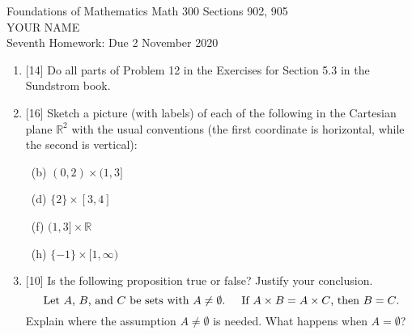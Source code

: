 \documentclass[12pt]{article}
\newcommand{\RR}{{\mathbb R}}
\begin{document}
\LARGE 
\noindent
{\color{Maroon}Foundations of Mathematics \hfill Math 300 Sections 902, 905}\vspace{2pt}\\
\Large YOUR NAME\vspace{2pt}\\
\large
Seventh Homework: \hfill Due 2 November 2020
\normalsize    %

\noindent{\color{blue}\rule{529pt}{2pt}}

  
\begin{enumerate}


\item{[14]} Do all parts of Problem 12 in the Exercises for Section 5.3 in the Sundstrom book.

\item{[16]} Sketch a picture (with labels) of each of the following in the Cartesian plane $\RR^2$ with the usual conventions
    (the first coordinate is horizontal, while the second is vertical):

  \ (b) $(0,2)\times (1,3]$

  \  (d) $\{2\}\times [3,4]$ 

  \makebox[250pt][l]{(e) $\RR\times (2,4)$}\    (f) $(1,3]\times \RR$

  \makebox[250pt][l]{(g) $\RR\times \{-1\}$}\   (h) $\{-1\}\times [1,\infty)$




\item{[10]}  Is the following proposition true or false?  Justify your conclusion.
  \[
    \mbox{ Let $A$, $B$, and $C$ be sets with $A\neq\emptyset$. \quad
    If $A\times B= A\times C$, then $B=C$.}
  \]
  Explain where the assumption $A\neq\emptyset$ is needed.
  What happens when $A=\emptyset$?



\end{enumerate}
\end{document}
